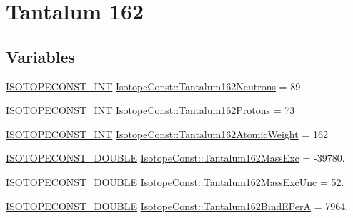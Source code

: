 \hypertarget{group___isotope_const-_tantalum-_ta162}{}\section{Tantalum 162}
\label{group___isotope_const-_tantalum-_ta162}
\subsection*{Variables}
\begin{DoxyCompactItemize}
\item 
\mbox{\hyperlink{group___isotope_const-_macros_ga5f18360b3e99483a35c32d789e62621c}{I\+S\+O\+T\+O\+P\+E\+C\+O\+N\+S\+T\+\_\+\+I\+NT}} \mbox{\hyperlink{group___isotope_const-_tantalum-_ta162_ga46d53a501f836db1c043321bb2f5a10c}{Isotope\+Const\+::\+Tantalum162\+Neutrons}} = 89
\item 
\mbox{\hyperlink{group___isotope_const-_macros_ga5f18360b3e99483a35c32d789e62621c}{I\+S\+O\+T\+O\+P\+E\+C\+O\+N\+S\+T\+\_\+\+I\+NT}} \mbox{\hyperlink{group___isotope_const-_tantalum-_ta162_ga141d30600fb9088adb6e8561875a5c8d}{Isotope\+Const\+::\+Tantalum162\+Protons}} = 73
\item 
\mbox{\hyperlink{group___isotope_const-_macros_ga5f18360b3e99483a35c32d789e62621c}{I\+S\+O\+T\+O\+P\+E\+C\+O\+N\+S\+T\+\_\+\+I\+NT}} \mbox{\hyperlink{group___isotope_const-_tantalum-_ta162_ga26effcbfabfafa111435d52076fa6c27}{Isotope\+Const\+::\+Tantalum162\+Atomic\+Weight}} = 162
\item 
\mbox{\hyperlink{group___isotope_const-_macros_ga8f45a7272ce02c0b4c65c44636ed719a}{I\+S\+O\+T\+O\+P\+E\+C\+O\+N\+S\+T\+\_\+\+D\+O\+U\+B\+LE}} \mbox{\hyperlink{group___isotope_const-_tantalum-_ta162_ga35b7a92e709924ebae56546120786e53}{Isotope\+Const\+::\+Tantalum162\+Mass\+Exc}} = -\/39780.
\item 
\mbox{\hyperlink{group___isotope_const-_macros_ga8f45a7272ce02c0b4c65c44636ed719a}{I\+S\+O\+T\+O\+P\+E\+C\+O\+N\+S\+T\+\_\+\+D\+O\+U\+B\+LE}} \mbox{\hyperlink{group___isotope_const-_tantalum-_ta162_ga8f0affbfbdec256dd7051b49ff217356}{Isotope\+Const\+::\+Tantalum162\+Mass\+Exc\+Unc}} = 52.
\item 
\mbox{\hyperlink{group___isotope_const-_macros_ga8f45a7272ce02c0b4c65c44636ed719a}{I\+S\+O\+T\+O\+P\+E\+C\+O\+N\+S\+T\+\_\+\+D\+O\+U\+B\+LE}} \mbox{\hyperlink{group___isotope_const-_tantalum-_ta162_gae72b1b60e0fa90ebc773a1a2c8a16316}{Isotope\+Const\+::\+Tantalum162\+Bind\+E\+PerA}} = 7964.
\item 

\end{DoxyCompactItemize}
